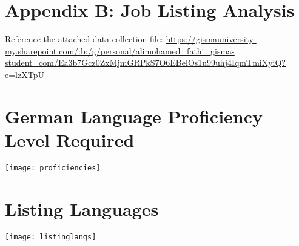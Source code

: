 \section{Appendix B: Job Listing Analysis}
\label{appendix:B}
\vspace*{1em}
Reference the attached data collection file: \url{https://gismauniversity-my.sharepoint.com/:b:/g/personal/alimohamed\_fathi\_gisma-student\_com/Ea3b7Gcz0ZxMjmGRPkS7O6EBelOs1u99uhj4IqmTmiXyiQ?e=lzXTpU} \\


\graphicspath{ {./attachments/appB} }
\noindent
\section*{German Language Proficiency Level Required} \vspace{1em}

\texttt{[image: proficiencies]}

\section*{Listing Languages} \vspace{1em}

\texttt{[image: listinglangs]}

\clearpage